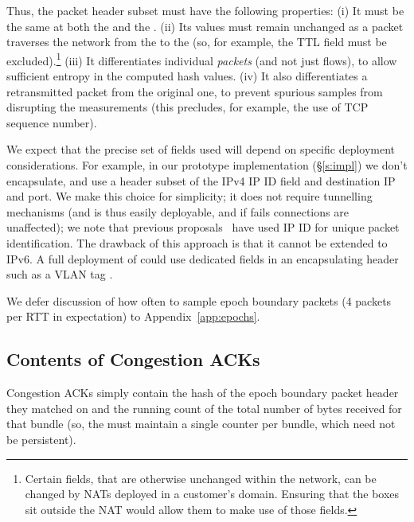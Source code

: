 Thus, the packet header subset must have the following properties:
(i) It must be the same at both the \inbox and the \outbox.
(ii) Its values must remain unchanged as a packet traverses the network from the \inbox to the \outbox (so, for example, the TTL field must be excluded).\footnote{Certain fields, that are otherwise unchanged within the network, can be changed by NATs deployed in a customer's domain. Ensuring that the \name boxes sit outside the NAT would allow them to make use of those fields.}
(iii) It differentiates individual \emph{packets} (and not just flows), to allow sufficient entropy in the computed hash values.
(iv) It also differentiates a retransmitted packet from the original one, to prevent spurious samples from disrupting the measurements (this precludes, for example, the use of TCP sequence number).

We expect that the precise set of fields used will depend on specific deployment considerations.
For example, in our prototype implementation (\S\ref{s:impl}) we don't encapsulate, and use a header subset of the IPv4 IP ID field and destination IP and port. 
We make this choice for simplicity; it does not require tunnelling mechanisms (and is thus easily deployable, and if \name fails connections are unaffected); we note that previous proposals~\cite{ip-traceback} have used IP ID for unique packet identification. The drawback of this approach is that it cannot be extended to IPv6.
A full deployment  of \name could use dedicated fields in an encapsulating header such as a VLAN tag .

We defer discussion of how often to sample epoch boundary packets (4 packets per RTT in expectation) to Appendix~\ref{app:epochs}.

\subsection{Contents of Congestion ACKs}
\label{s:measure:compute}
\newcommand{\pone}{$p_{i-1}$}
\newcommand{\hpone}{$h(p_{i-1})$}
\newcommand{\sone}{$s_{i-1}$}
\newcommand{\rone}{$r_{i-1}$}
\newcommand{\ptwo}{$p_{i}$}
\newcommand{\hptwo}{$h(p_{i})$}
\newcommand{\stwo}{$s_{i}$}
\newcommand{\rtwo}{$r_{i}$}
\newcommand{\atwo}{$a_{i}$}
\newcommand{\sentone}{$sent_{i-1}$}
\newcommand{\recvdone}{$rcvd_{i-1}$}
\newcommand{\senttwo}{$sent_{i}$}
\newcommand{\recvdtwo}{$rcvd_{i}$}

Congestion ACKs simply contain the hash of the epoch boundary packet header they matched on and the running count of the total number of bytes received for that bundle (so, the \outbox must maintain a single counter per bundle, which need not be persistent).

